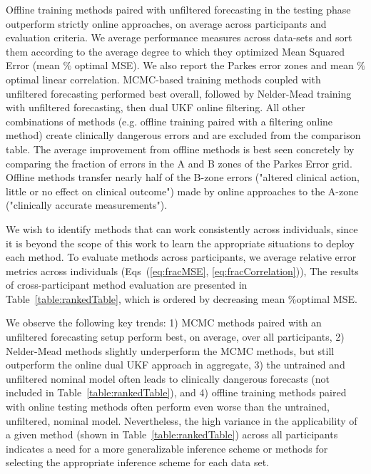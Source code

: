 \documentclass[10pt,letterpaper]{article}
\begin{document}
\begin{table}[!ht]
\begin{adjustwidth}{-2.25in}{0in}
\begin{flushleft} Offline training methods paired with unfiltered forecasting in the testing phase outperform strictly online approaches, on average across participants and evaluation criteria.
We average performance measures across data-sets and sort them according to the average degree to which they optimized Mean Squared Error (mean $\%$ optimal MSE). We also report the Parkes error zones and mean $\%$ optimal linear correlation. MCMC-based training methods coupled with unfiltered forecasting performed best overall, followed by Nelder-Mead training with unfiltered forecasting, then dual UKF online filtering. All other combinations of methods (e.g. offline training paired with a filtering online method) create clinically dangerous errors and are excluded from the comparison table. The average improvement from offline methods is best seen concretely by comparing the fraction of errors in the A and B zones of the Parkes Error grid. Offline methods transfer nearly half of the B-zone errors ("altered clinical action, little or no effect on clinical outcome") made by online approaches to the A-zone ("clinically accurate measurements").
\end{flushleft}
\end{adjustwidth}
\end{table}

We wish to identify methods that can work consistently across individuals, since it is beyond the scope of this work to learn the appropriate situations to deploy each method.
To evaluate methods across participants, we average relative error metrics across individuals (Eqs~(\ref{eq:fracMSE}, \ref{eq:fracCorrelation})),
The results of cross-participant method evaluation are presented in Table~\ref{table:rankedTable}, which is ordered by decreasing mean $\%$optimal MSE.

We observe the following key trends: 1) MCMC methods paired with an unfiltered forecasting setup perform best, on average, over all participants, 2) Nelder-Mead methods slightly underperform the MCMC methods, but still outperform the online dual UKF approach in aggregate, 3) the untrained and unfiltered nominal model often leads to clinically dangerous forecasts (not included in Table~\ref{table:rankedTable}), and 4) offline training methods paired with online testing methods often perform even worse than the untrained, unfiltered, nominal model. Nevertheless, the high variance in the applicability of a given method (shown in Table~\ref{table:rankedTable}) across all participants indicates a need for a more generalizable inference scheme or methods for selecting the appropriate inference scheme for each data set.
\end{document}
